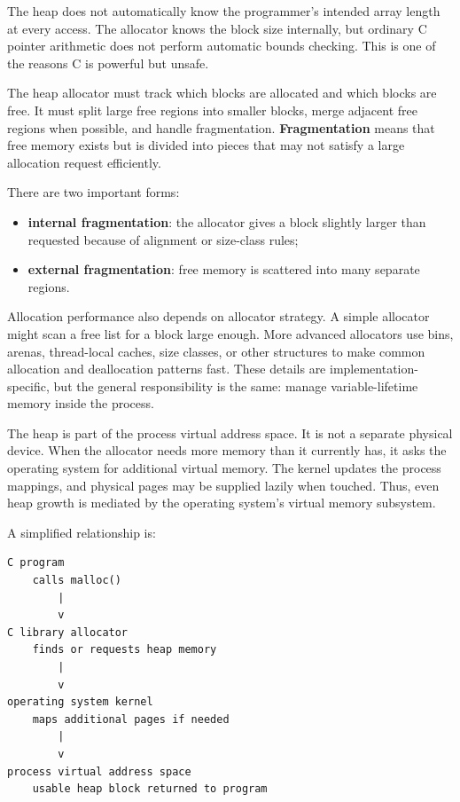 The heap does not automatically know the programmer's intended array length at every access. The allocator knows the block size internally, but ordinary C pointer arithmetic does not perform automatic bounds checking. This is one of the reasons C is powerful but unsafe.

The heap allocator must track which blocks are allocated and which blocks are free. It must split large free regions into smaller blocks, merge adjacent free regions when possible, and handle fragmentation. \textbf{Fragmentation} means that free memory exists but is divided into pieces that may not satisfy a large allocation request efficiently.

There are two important forms:

\begin{itemize}
    \item \textbf{internal fragmentation}: the allocator gives a block slightly larger than requested because of alignment or size-class rules;
    \item \textbf{external fragmentation}: free memory is scattered into many separate regions.
\end{itemize}

Allocation performance also depends on allocator strategy. A simple allocator might scan a free list for a block large enough. More advanced allocators use bins, arenas, thread-local caches, size classes, or other structures to make common allocation and deallocation patterns fast. These details are implementation-specific, but the general responsibility is the same: manage variable-lifetime memory inside the process.

The heap is part of the process virtual address space. It is not a separate physical device. When the allocator needs more memory than it currently has, it asks the operating system for additional virtual memory. The kernel updates the process mappings, and physical pages may be supplied lazily when touched. Thus, even heap growth is mediated by the operating system's virtual memory subsystem.

A simplified relationship is:

\begin{verbatim}
C program
    calls malloc()
        |
        v
C library allocator
    finds or requests heap memory
        |
        v
operating system kernel
    maps additional pages if needed
        |
        v
process virtual address space
    usable heap block returned to program
\end{verbatim}

